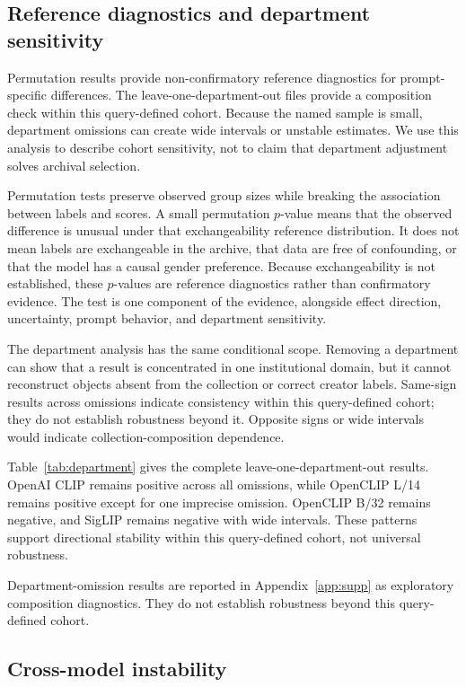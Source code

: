\documentclass[pdflatex,sn-basic,Numbered]{sn-jnl}
\begin{document}
\subsection{Reference diagnostics and department sensitivity}

Permutation results provide non-confirmatory reference diagnostics for prompt-specific differences. The leave-one-department-out files provide a composition check within this query-defined cohort. Because the named sample is small, department omissions can create wide intervals or unstable estimates. We use this analysis to describe cohort sensitivity, not to claim that department adjustment solves archival selection.

Permutation tests preserve observed group sizes while breaking the association between labels and scores. A small permutation $p$-value means that the observed difference is unusual under that exchangeability reference distribution. It does not mean labels are exchangeable in the archive, that data are free of confounding, or that the model has a causal gender preference. Because exchangeability is not established, these $p$-values are reference diagnostics rather than confirmatory evidence. The test is one component of the evidence, alongside effect direction, uncertainty, prompt behavior, and department sensitivity.

The department analysis has the same conditional scope. Removing a department can show that a result is concentrated in one institutional domain, but it cannot reconstruct objects absent from the collection or correct creator labels. Same-sign results across omissions indicate consistency within this query-defined cohort; they do not establish robustness beyond it. Opposite signs or wide intervals would indicate collection-composition dependence.

Table~\ref{tab:department} gives the complete leave-one-department-out results. OpenAI CLIP remains positive across all omissions, while OpenCLIP L/14 remains positive except for one imprecise omission. OpenCLIP B/32 remains negative, and SigLIP remains negative with wide intervals. These patterns support directional stability within this query-defined cohort, not universal robustness.

Department-omission results are reported in Appendix~\ref{app:supp} as exploratory composition diagnostics. They do not establish robustness beyond this query-defined cohort.

\subsection{Cross-model instability}
\end{document}

